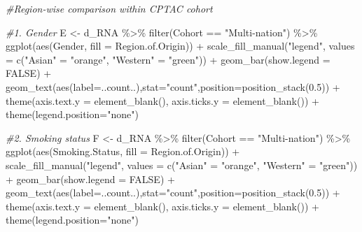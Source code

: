 \documentclass[
]{article}
\newenvironment{Shaded}{\begin{snugshade}}{\end{snugshade}}
\newcommand{\AttributeTok}[1]{\textcolor[rgb]{0.77,0.63,0.00}{#1}}
\newcommand{\CommentTok}[1]{\textcolor[rgb]{0.56,0.35,0.01}{\textit{#1}}}
\newcommand{\ConstantTok}[1]{\textcolor[rgb]{0.00,0.00,0.00}{#1}}
\newcommand{\FloatTok}[1]{\textcolor[rgb]{0.00,0.00,0.81}{#1}}
\newcommand{\FunctionTok}[1]{\textcolor[rgb]{0.00,0.00,0.00}{#1}}
\newcommand{\NormalTok}[1]{#1}
\newcommand{\OtherTok}[1]{\textcolor[rgb]{0.56,0.35,0.01}{#1}}
\newcommand{\SpecialCharTok}[1]{\textcolor[rgb]{0.00,0.00,0.00}{#1}}
\newcommand{\StringTok}[1]{\textcolor[rgb]{0.31,0.60,0.02}{#1}}
\begin{document}
\begin{Shaded}
\begin{Highlighting}[]
\CommentTok{\#Region{-}wise comparison within CPTAC cohort}

\CommentTok{\#1. Gender}
\NormalTok{E }\OtherTok{\textless{}{-}}\NormalTok{ d\_RNA }\SpecialCharTok{\%\textgreater{}\%} 
  \FunctionTok{filter}\NormalTok{(Cohort }\SpecialCharTok{==} \StringTok{"Multi{-}nation"}\NormalTok{) }\SpecialCharTok{\%\textgreater{}\%}
  \FunctionTok{ggplot}\NormalTok{(}\FunctionTok{aes}\NormalTok{(Gender, }\AttributeTok{fill =}\NormalTok{ Region.of.Origin)) }\SpecialCharTok{+} 
  \FunctionTok{scale\_fill\_manual}\NormalTok{(}\StringTok{"legend"}\NormalTok{, }\AttributeTok{values =} \FunctionTok{c}\NormalTok{(}\StringTok{"Asian"} \OtherTok{=} \StringTok{"orange"}\NormalTok{, }\StringTok{"Western"} \OtherTok{=} \StringTok{"green"}\NormalTok{)) }\SpecialCharTok{+}
  \FunctionTok{geom\_bar}\NormalTok{(}\AttributeTok{show.legend =} \ConstantTok{FALSE}\NormalTok{) }\SpecialCharTok{+}
  \FunctionTok{geom\_text}\NormalTok{(}\FunctionTok{aes}\NormalTok{(}\AttributeTok{label=}\NormalTok{..count..),}\AttributeTok{stat=}\StringTok{"count"}\NormalTok{,}\AttributeTok{position=}\FunctionTok{position\_stack}\NormalTok{(}\FloatTok{0.5}\NormalTok{)) }\SpecialCharTok{+}
  \FunctionTok{theme}\NormalTok{(}\AttributeTok{axis.text.y =} \FunctionTok{element\_blank}\NormalTok{(),}
        \AttributeTok{axis.ticks.y =} \FunctionTok{element\_blank}\NormalTok{()) }\SpecialCharTok{+} 
  \FunctionTok{theme}\NormalTok{(}\AttributeTok{legend.position=}\StringTok{"none"}\NormalTok{)}

\CommentTok{\#2. Smoking status}
\NormalTok{F }\OtherTok{\textless{}{-}}\NormalTok{ d\_RNA }\SpecialCharTok{\%\textgreater{}\%}
  \FunctionTok{filter}\NormalTok{(Cohort }\SpecialCharTok{==} \StringTok{"Multi{-}nation"}\NormalTok{) }\SpecialCharTok{\%\textgreater{}\%}
  \FunctionTok{ggplot}\NormalTok{(}\FunctionTok{aes}\NormalTok{(Smoking.Status, }\AttributeTok{fill =}\NormalTok{ Region.of.Origin)) }\SpecialCharTok{+} 
  \FunctionTok{scale\_fill\_manual}\NormalTok{(}\StringTok{"legend"}\NormalTok{, }\AttributeTok{values =} \FunctionTok{c}\NormalTok{(}\StringTok{"Asian"} \OtherTok{=} \StringTok{"orange"}\NormalTok{, }\StringTok{"Western"} \OtherTok{=} \StringTok{"green"}\NormalTok{)) }\SpecialCharTok{+}
  \FunctionTok{geom\_bar}\NormalTok{(}\AttributeTok{show.legend =} \ConstantTok{FALSE}\NormalTok{) }\SpecialCharTok{+}
  \FunctionTok{geom\_text}\NormalTok{(}\FunctionTok{aes}\NormalTok{(}\AttributeTok{label=}\NormalTok{..count..),}\AttributeTok{stat=}\StringTok{"count"}\NormalTok{,}\AttributeTok{position=}\FunctionTok{position\_stack}\NormalTok{(}\FloatTok{0.5}\NormalTok{)) }\SpecialCharTok{+}
  \FunctionTok{theme}\NormalTok{(}\AttributeTok{axis.text.y =} \FunctionTok{element\_blank}\NormalTok{(),}
        \AttributeTok{axis.ticks.y =} \FunctionTok{element\_blank}\NormalTok{()) }\SpecialCharTok{+} 
  \FunctionTok{theme}\NormalTok{(}\AttributeTok{legend.position=}\StringTok{"none"}\NormalTok{)}


\end{Highlighting}
\end{Shaded}
\end{document}
